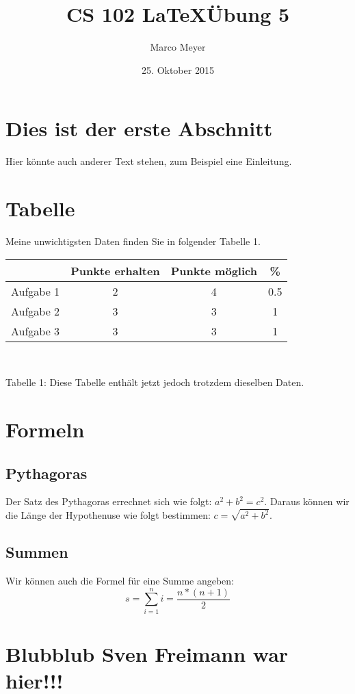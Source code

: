 \documentclass{article}
\author{Marco Meyer}
\title{CS 102 \LaTeX  \"Ubung 5}
\date{25. Oktober 2015}
\begin{document}
\maketitle
\section{Dies ist der erste Abschnitt}
Hier k\"onnte auch anderer Text stehen, zum Beispiel eine Einleitung.

\section{Tabelle}
Meine unwichtigsten Daten finden Sie in folgender Tabelle 1.\\

\begin{tabular}[c]{c|c|c|c}

 & Punkte erhalten & Punkte m\"oglich & \%\\
\hline
Aufgabe 1 & 2 & 4 &0.5 \\
Aufgabe 2 & 3 & 3 &1\\
Aufgabe 3 & 3 & 3 &1 \\

\end{tabular} \\
\begin{center}
Tabelle 1: Diese Tabelle enthält jetzt jedoch trotzdem dieselben Daten.
\end{center} 

\section{Formeln}
\subsection{Pythagoras}
Der Satz des Pythagoras errechnet sich wie folgt: $ a^{2}+b^{2}=c^{2} $. Daraus k\"onnen wir die L\"ange der Hypothenuse wie folgt bestimmen: $ c=\sqrt{a^{2}+b^{2}} $.
\subsection{Summen}
Wir k\"onnen auch die Formel f\"ur eine Summe angeben:\\ 
\begin{equation}
	s=\sum_{i=1}^n i=\frac{n*(n+1)}{2}
	\label{eq:formel}
\end{equation} 
\section{Blubblub Sven Freimann war hier!!!}
\end{document}
